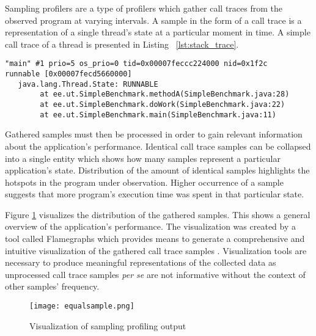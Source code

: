 \documentclass[..thesis.tex]{subfiles}
\begin{document}
Sampling profilers are a type of profilers which gather call traces from the observed program at varying intervals. A sample in the form of a call trace is a representation of a single thread's state at a particular moment in time. A simple call trace of a thread is presented in Listing ~\ref{lst:stack_trace}. 

\begin{lstlisting}[style=def,label={lst:stack_trace}, caption={Call trace of a thread}]
"main" #1 prio=5 os_prio=0 tid=0x00007feccc224000 nid=0x1f2c 
runnable [0x00007fecd5660000]
   java.lang.Thread.State: RUNNABLE
	    at ee.ut.SimpleBenchmark.methodA(SimpleBenchmark.java:28)
    	at ee.ut.SimpleBenchmark.doWork(SimpleBenchmark.java:22)
	    at ee.ut.SimpleBenchmark.main(SimpleBenchmark.java:11)
\end{lstlisting}


Gathered samples must then be processed in order to gain relevant information about the application's performance. Identical call trace samples can be collapsed into a single entity which shows how many samples represent a particular application's state.
Distribution of the amount of identical samples highlights the hotspots in the program under observation. Higher occurrence of a sample suggests that more program's execution time was spent in that particular state. 

Figure \ref{fig:samplingProf} visualizes the distribution of the gathered samples. This shows a general overview of the application's performance. The visualization was created by a tool called Flamegraphs which provides means to generate a comprehensive and intuitive visualization of the gathered call trace samples \cite{gregg_flame}. Visualization tools are necessary to produce meaningful representations of the collected data as unprocessed call trace samples \textit{per se} are not informative without the context of other samples' frequency.

\begin{figure}[H]
\texttt{[image: equalsample.png]}
\caption{Visualization of sampling profiling output}
\label{fig:samplingProf}
\end{figure}
\end{document}
